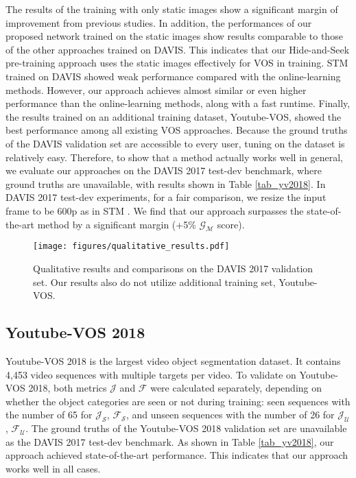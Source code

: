 The results of the training with only static images show a significant margin of improvement from previous studies. In addition, the performances of our proposed network trained on the static images show results comparable to those of the other approaches trained on DAVIS. This indicates that our Hide-and-Seek pre-training approach uses the static images effectively for VOS in training. STM \cite{Oh_2019_ICCV} trained on DAVIS showed weak performance compared with the online-learning methods. However, our approach achieves almost similar or even higher performance than the online-learning methods, along with a fast runtime. Finally, the results trained on an additional training dataset, Youtube-VOS, showed the best performance among all existing VOS approaches. Because the ground truths of the DAVIS validation set are accessible to every user, tuning on the dataset is relatively easy. Therefore, to show that a method actually works well in general, we evaluate our approaches on the DAVIS 2017 test-dev benchmark, where ground truths are unavailable, with results shown in Table \ref{tab_yv2018}. In DAVIS 2017 test-dev experiments, for a fair comparison, we resize the input frame to be 600p as in STM \cite{Oh_2019_ICCV}. We find that our approach surpasses the state-of-the-art method by a significant margin (+5\% $\mathcal{G_M}$ score).

\begin{figure}[t]
\centering
\texttt{[image: figures/qualitative\_results.pdf]}
\caption{
Qualitative results and comparisons on the DAVIS 2017 validation set. Our results also do not utilize additional training set, Youtube-VOS.
}
\label{fig:qualitative_results}
\end{figure}

\subsection{Youtube-VOS 2018}
\label{s44}
Youtube-VOS 2018 \cite{xu2018youtube} is the largest video object segmentation dataset. It contains 4,453 video sequences with multiple targets per video. To validate on Youtube-VOS 2018, both metrics $\mathcal{J}$ and $\mathcal{F}$ were calculated separately, depending on whether the object categories are seen or not during training: seen sequences with the number of 65 for $\mathcal{J_S}$, $\mathcal{F_S}$, and unseen sequences with the number of 26 for $\mathcal{J_U}$, $\mathcal{F_U}$. The ground truths of the Youtube-VOS 2018 validation set are unavailable as the DAVIS 2017 test-dev benchmark. As shown in Table \ref{tab_yv2018}, our approach achieved state-of-the-art performance. This indicates that our approach works well in all cases.

